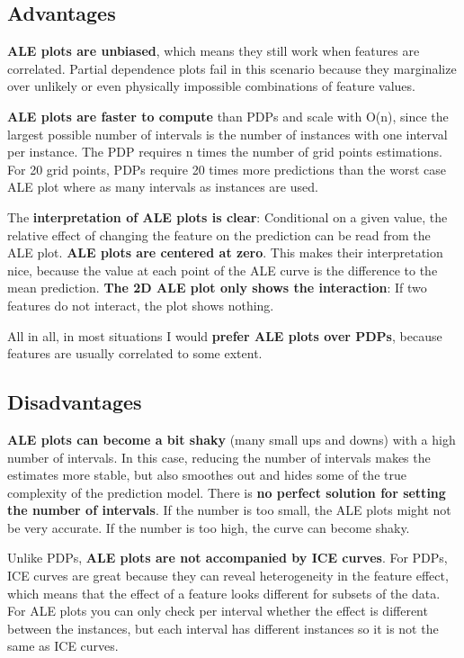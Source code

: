 \documentclass[
  12pt,
]{krantz}
\begin{document}
\hypertarget{advantages-6}{%
\subsection{Advantages}\label{advantages-6}}

\textbf{ALE plots are unbiased}, which means they still work when features are correlated.
Partial dependence plots fail in this scenario because they marginalize over unlikely or even physically impossible combinations of feature values.

\textbf{ALE plots are faster to compute} than PDPs and scale with O(n), since the largest possible number of intervals is the number of instances with one interval per instance.
The PDP requires n times the number of grid points estimations.
For 20 grid points, PDPs require 20 times more predictions than the worst case ALE plot where as many intervals as instances are used.

The \textbf{interpretation of ALE plots is clear}: Conditional on a given value, the relative effect of changing the feature on the prediction can be read from the ALE plot.
\textbf{ALE plots are centered at zero}.
This makes their interpretation nice, because the value at each point of the ALE curve is the difference to the mean prediction.
\textbf{The 2D ALE plot only shows the interaction}:
If two features do not interact, the plot shows nothing.

All in all, in most situations I would \textbf{prefer ALE plots over PDPs}, because features are usually correlated to some extent.

\hypertarget{disadvantages-6}{%
\subsection{Disadvantages}\label{disadvantages-6}}

\textbf{ALE plots can become a bit shaky} (many small ups and downs) with a high number of intervals.
In this case, reducing the number of intervals makes the estimates more stable, but also smoothes out and hides some of the true complexity of the prediction model.
There is \textbf{no perfect solution for setting the number of intervals}.
If the number is too small, the ALE plots might not be very accurate.
If the number is too high, the curve can become shaky.

Unlike PDPs, \textbf{ALE plots are not accompanied by ICE curves}.
For PDPs, ICE curves are great because they can reveal heterogeneity in the feature effect, which means that the effect of a feature looks different for subsets of the data.
For ALE plots you can only check per interval whether the effect is different between the instances, but each interval has different instances so it is not the same as ICE curves.
\end{document}
